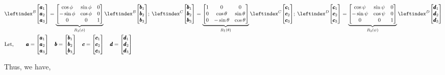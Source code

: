 \begin{align*}
     &\lx{^B}{\bm{\pmb a_1 \\ \pmb a_2 \\ \pmb a_3}} =
     \underbrace{
        \bm{
            \cos \phi & \sin \phi  & 0\\
            -\sin \phi & \cos \phi & 0\\
            0          & 0         & 1
        }
     } _ {R_3 (\phi)}
    \lx{^B}{\bm{\pmb b_1 \\ \pmb b_2 \\ \pmb b_3}} ;\:
    \lx{^C}{\bm{\pmb b_1 \\ \pmb b_2 \\ \pmb b_3}} =
    \underbrace{
        \bm{
            1 & 0 & 0\\
            0 & \cos \theta & \sin \theta\\
            0 & -\sin \theta & \cos \theta
        }
     } _ {R_1 (\theta)}
    \lx{^C}{\bm{\pmb c_1 \\ \pmb c_2 \\ \pmb c_3}} ;\:
    \lx{^D}{\bm{\pmb c_1 \\ \pmb c_2 \\ \pmb c_3}} =
     \underbrace{
        \bm{
            \cos \psi & \sin \psi  & 0\\
            -\sin \psi & \cos \psi & 0\\
            0          & 0         & 1
        }
     } _ {R_3 (\psi)}
    \lx{^D}{\bm{\pmb d_1 \\ \pmb d_2 \\ \pmb d_3}} \\
    &\text{Let, } \qquad
    \pmb a = \bm{\pmb a_1 \\ \pmb a_2 \\ \pmb a_3} \quad
    \pmb b = \bm{\pmb b_1 \\ \pmb b_2 \\ \pmb b_3} \quad
    \pmb c = \bm{\pmb c_1 \\ \pmb c_2 \\ \pmb c_3} \quad
    \pmb d = \bm{\pmb d_1 \\ \pmb d_2 \\ \pmb d_3}
\end{align*}

Thus, we have,

